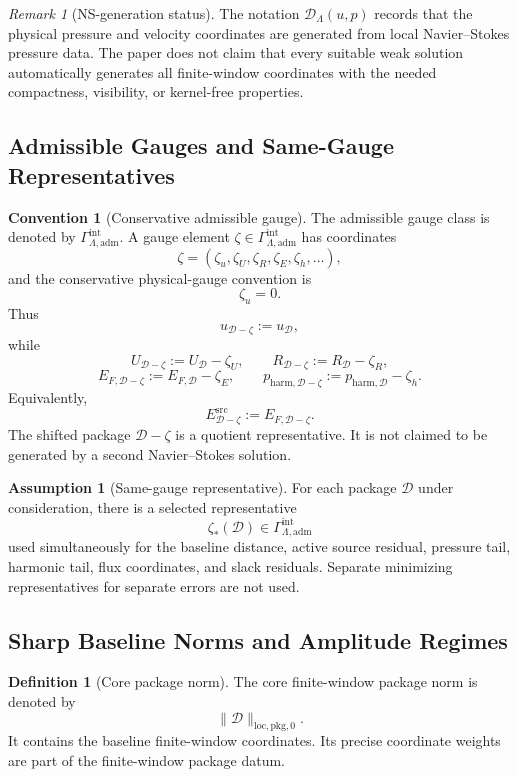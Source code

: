 \documentclass[11pt]{article}
\numberwithin{equation}{section}
\theoremstyle{definition}
\newtheorem{definition}[definition]{Definition}
\newtheorem{assumption}[assumption]{Assumption}
\newtheorem{convention}[convention]{Convention}
\theoremstyle{remark}
\newtheorem{remark}[remark]{Remark}
\newcommand{\loc}{\mathrm{loc}}
\newcommand{\pkg}{\mathrm{pkg}}
\newcommand{\adm}{\mathrm{adm}}
\newcommand{\harm}{\mathrm{harm}}
\newcommand{\src}{\mathrm{src}}
\newcommand{\calD}{\mathcal D}
\newcommand{\Gadm}{\Gamma^{\mathrm{int}}_{\Lambda,\adm}}
\begin{document}
\begin{remark}[NS-generation status]
The notation \(\calD_\Lambda(u,p)\) records that the physical pressure and
velocity coordinates are generated from local Navier--Stokes pressure data.
The paper does not claim that every suitable weak solution automatically
generates all finite-window coordinates with the needed compactness,
visibility, or kernel-free properties.
\end{remark}

\subsection{Admissible Gauges and Same-Gauge Representatives}
\label{ps:sec:gauges}

\begin{convention}[Conservative admissible gauge]
\label{ps:conv:admissible-gauge}
The admissible gauge class is denoted by \(\Gadm\).  A gauge element
\(\zeta\in\Gadm\) has coordinates
\[
    \zeta=(\zeta_u,\zeta_U,\zeta_R,\zeta_E,\zeta_h,\ldots),
\]
and the conservative physical-gauge convention is
\[
    \zeta_u=0.
\]
Thus
\[
    u_{\calD-\zeta}:=u_{\calD},
\]
while
\[
    U_{\calD-\zeta}:=U_{\calD}-\zeta_U,
    \qquad
    R_{\calD-\zeta}:=R_{\calD}-\zeta_R,
\]
\[
    E_{F,\calD-\zeta}:=E_{F,\calD}-\zeta_E,
    \qquad
    p_{\harm,\calD-\zeta}:=p_{\harm,\calD}-\zeta_h.
\]
Equivalently,
\[
    E^{\src}_{\calD-\zeta}:=E_{F,\calD-\zeta}.
\]
The shifted package \(\calD-\zeta\) is a quotient representative.  It is not
claimed to be generated by a second Navier--Stokes solution.
\end{convention}

\begin{assumption}[Same-gauge representative]
\label{ps:ass:same-gauge-representative}
For each package \(\calD\) under consideration, there is a selected
representative
\[
    \zeta_*(\calD)\in\Gadm
\]
used simultaneously for the baseline distance, active source residual,
pressure tail, harmonic tail, flux coordinates, and slack residuals.
Separate minimizing representatives for separate errors are not used.
\end{assumption}

\subsection{Sharp Baseline Norms and Amplitude Regimes}
\label{ps:sec:amplitude-regimes}

\begin{definition}[Core package norm]
\label{ps:def:core-package-norm}
The core finite-window package norm is denoted by
\[
    \|\calD\|_{\loc,\pkg,0}.
\]
It contains the baseline finite-window coordinates.  Its precise coordinate
weights are part of the finite-window package datum.
\end{definition}
\end{document}
